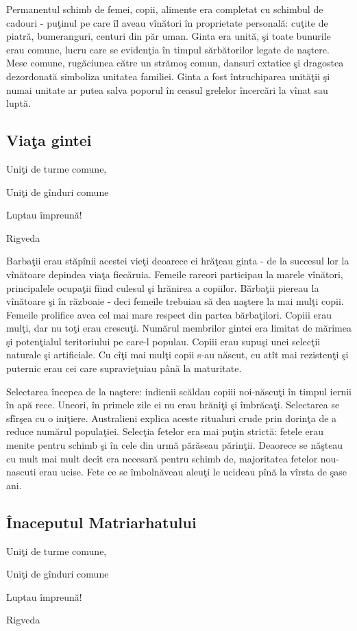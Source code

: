 Permanentul schimb de femei, copii, alimente era completat cu schimbul de cadouri -  puţinul pe care îl aveau vînători în proprietate personală: cuţite de piatră, bumeranguri, centuri din păr uman. Ginta era unită, şi toate bunurile erau comune, lucru care se evidenţia în timpul sărbătorilor legate de naştere. Mese comune, rugăciunea către un strămoş comun, dansuri extatice şi dragostea dezordonată simboliza unitatea familiei. Ginta a fost întruchiparea unităţii şi numai unitate ar putea salva poporul în ceasul  grelelor încercări la vînat sau luptă.

\subsection{Viaţa gintei}
\epigraph{Uniţi de turme comune,

Uniţi de gînduri comune

Luptau împreună!}{Rigveda}

Barbaţii erau stăpînii acestei vieţi deoarece ei hrăţeau ginta - de la succesul lor la vînătoare depindea viaţa fiecăruia. Femeile rareori  participau la marele vînători, principalele ocupaţii fiind culesul şi hrănirea a copiilor. Bărbaţii piereau la vînătoare şi în războaie - deci femeile trebuiau să dea naştere la mai mulţi copii. Femeile  prolifice avea cel mai mare respect din partea bărbaţilori. Copiii erau mulţi, dar nu toţi erau crescuţi.  Numărul membrilor gintei era limitat de mărimea şi potenţialul teritoriului pe care-l populau. Copiii erau supuşi unei selecţii naturale şi artificiale. Cu cîţi mai mulţi copii s-au născut, cu atît mai rezistenţi şi puternic erau cei care  supravieţuiau până la maturitate.

Selectarea începea de la naştere: indienii scăldau copiii noi-născuţi în timpul iernii în apă rece. Uneori, în primele zile ei nu erau hrăniţi şi îmbrăcaţi. Selectarea se sfîrşea cu o iniţiere. Australieni explica aceste ritualuri  crude prin dorinţa de a reduce numărul populaţiei. Selecţia fetelor era  mai puţin strictă: fetele erau menite pentru schimb şi în cele din urmă părăseau părinţii. Deaorece se năşteau cu mult mai mult decît era necesară pentru schimb de, majoritatea fetelor nou-nascuti erau ucise. Fete ce se îmbolnăveau aleuţi le ucideau pînă la vîrsta de şase ani.

\subsection{Înaceputul Matriarhatului}
\epigraph{Uniţi de turme comune,

Uniţi de gînduri comune

Luptau împreună!}{Rigveda}

